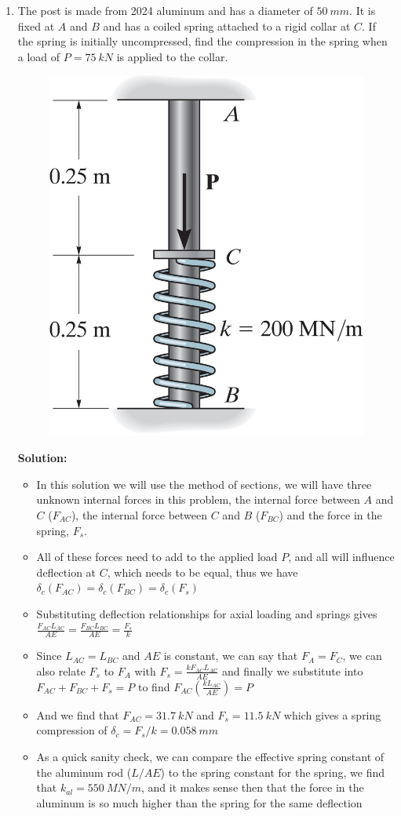 \documentclass[12pt, oneside]{article}
\begin{document}
\begin{enumerate}
	\item %
		The post is made from 2024 aluminum and has a diameter of $\SI{50}{mm}$.
		It is fixed at $A$ and $B$ and has a coiled spring attached to a rigid collar at $C$.
		If the spring is initially uncompressed, find the compression in the spring when a load of $P = \SI{75}{kN}$ is applied to the collar.
		\begin{figure}[H]
			\centering
			\includegraphics[width=0.45\linewidth]{4-59}
		\end{figure}
		\textbf{Solution:}
		\begin{itemize}
			\item In this solution we will use the method of sections, we will have three unknown internal forces in this problem, the internal force between $A$ and $C$ ($F_{AC}$), the internal force between $C$ and $B$ ($F_{BC}$) and the force in the spring, $F_s$.
			\item All of these forces need to add to the applied load $P$, and all will influence deflection at $C$, which needs to be equal, thus we have $\delta_c (F_{AC}) = \delta_c (F_{BC}) = \delta_c (F_s)$
			\item Substituting deflection relationships for axial loading and springs gives $ \frac{F_{AC} L_{AC}}{AE} = \frac{F_{BC}L_{BC}}{AE} = \frac{F_s}{k} $
			\item Since $L_{AC} = L_{BC}$ and $AE$ is constant, we can say that $F_A = F_C$, we can also relate $F_s$ to $F_A$ with $F_s = \frac{kF_{AC} L_{AC}}{AE}$ and finally we substitute into $F_{AC} + F_{BC} + F_s = P$ to find $ F_{AC}\left( \frac{k L_{AC}}{AE} \right) = P$
			\item And we find that $F_{AC} = \SI{31.7}{kN}$ and $F_s = \SI{11.5}{kN}$ which gives a spring compression of $ \delta_c = F_s / k = \SI{0.058}{mm} $
			\item As a quick sanity check, we can compare the effective spring constant of the aluminum rod ($L/AE$) to the spring constant for the spring, we find that $k_{al} = \SI{550}{MN/m}$, and it makes sense then that the force in the aluminum is so much higher than the spring for the same deflection
		\end{itemize}


\end{enumerate}
\end{document}
